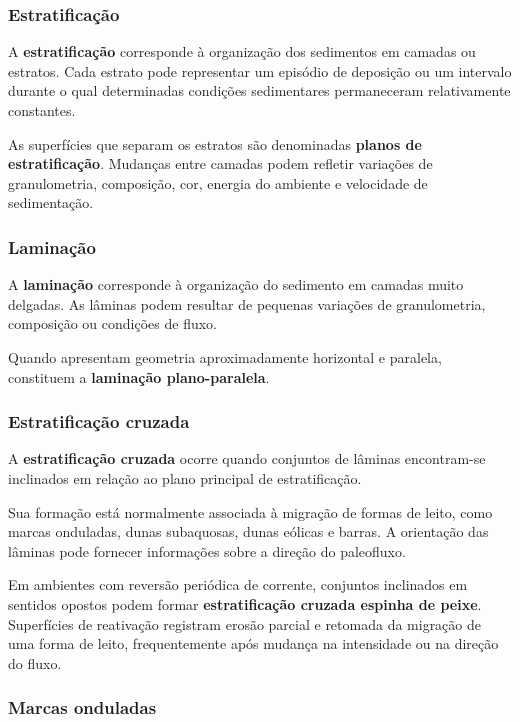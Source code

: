 \subsubsection{Estratificação}

A \textbf{estratificação} corresponde à organização dos sedimentos em camadas ou
estratos. Cada estrato pode representar um episódio de deposição ou um intervalo
durante o qual determinadas condições sedimentares permaneceram relativamente
constantes.

As superfícies que separam os estratos são denominadas
\textbf{planos de estratificação}. Mudanças entre camadas podem refletir
variações de granulometria, composição, cor, energia do ambiente e velocidade de
sedimentação.

\subsubsection{Laminação}

A \textbf{laminação} corresponde à organização do sedimento em camadas muito
delgadas. As lâminas podem resultar de pequenas variações de granulometria,
composição ou condições de fluxo.

Quando apresentam geometria aproximadamente horizontal e paralela, constituem a
\textbf{laminação plano-paralela}.

\subsubsection{Estratificação cruzada}

A \textbf{estratificação cruzada} ocorre quando conjuntos de lâminas encontram-se
inclinados em relação ao plano principal de estratificação.

Sua formação está normalmente associada à migração de formas de leito, como
marcas onduladas, dunas subaquosas, dunas eólicas e barras. A orientação das
lâminas pode fornecer informações sobre a direção do paleofluxo.

Em ambientes com reversão periódica de corrente, conjuntos inclinados em sentidos opostos podem formar \textbf{estratificação cruzada espinha de peixe}. Superfícies de reativação registram erosão parcial e retomada da migração de uma forma de leito, frequentemente após mudança na intensidade ou na direção do fluxo.

\subsubsection{Marcas onduladas}

